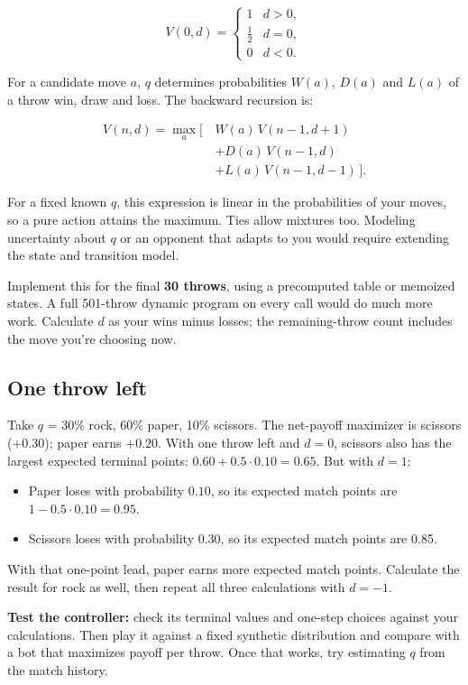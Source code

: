\documentclass[11pt]{article}
\begin{document}
\[
V(0,d)=\begin{cases}
1 & d>0,\\
\tfrac12 & d=0,\\
0 & d<0.
\end{cases}
\]

For a candidate move $a$, $q$ determines probabilities $W(a)$, $D(a)$ and $L(a)$ of a throw win, draw and loss. The backward recursion is:


\[
\begin{aligned}
V(n,d)=\max_a\bigl[\,&W(a)\,V(n-1,d+1)\\
                  &+D(a)\,V(n-1,d)\\
                  &+L(a)\,V(n-1,d-1)\,\bigr].
\end{aligned}
\]

For a fixed known $q$, this expression is linear in the probabilities of your moves, so a pure action attains the maximum. Ties allow mixtures too. Modeling uncertainty about $q$ or an opponent that adapts to you would require extending the state and transition model.


Implement this for the final \textbf{30 throws}, using a precomputed table or memoized states. A full 501-throw dynamic program on every call would do much more work. Calculate $d$ as your wins minus losses; the remaining-throw count includes the move you're choosing now.


\subsection*{One throw left}

Take $q$ = 30\% rock, 60\% paper, 10\% scissors. The net-payoff maximizer is scissors ($+0.30$); paper earns $+0.20$. With one throw left and $d=0$, scissors also has the largest expected terminal points: $0.60+0.5\cdot0.10=0.65$. But with $d=1$:


\begin{itemize}
\item Paper loses with probability $0.10$, so its expected match points are $1-0.5\cdot0.10=0.95$.
\item Scissors loses with probability 0.30, so its expected match points are 0.85.
\end{itemize}

With that one-point lead, paper earns more expected match points. Calculate the result for rock as well, then repeat all three calculations with $d=-1$.


\begin{checkpoint}
\textbf{Test the controller:} check its terminal values and one-step choices against your calculations. Then play it against a fixed synthetic distribution and compare with a bot that maximizes payoff per throw. Once that works, try estimating $q$ from the match history.
\end{checkpoint}
\clearpage
\end{document}
